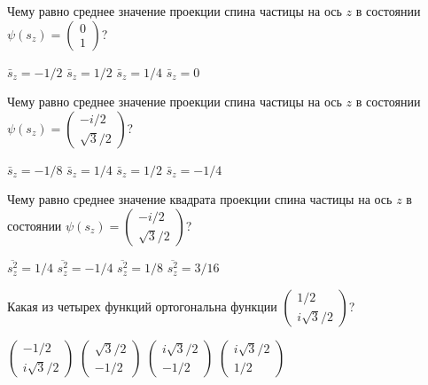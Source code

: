\documentclass[11pt,a4paper]{exam}
\begin{document}
\begin{questions}
\question Чему равно среднее значение проекции спина частицы на ось $z$ в состоянии $\psi ({s_z}) = \left( {\begin{array}{*{20}{c}}
0\\
1
\end{array}} \right)$?
\begin{choices}
\choice ${\bar s_z} =  - 1/2$      
\choice ${\bar s_z} = 1/2$      
\choice ${\bar s_z} = 1/4$      
\choice ${\bar s_z} = 0$
\end{choices}

\question Чему равно среднее значение проекции спина частицы на ось $z$ в состоянии $\psi ({s_z}) = \left( {\begin{array}{*{20}{c}}
{ - i/2}\\
{\sqrt 3 /2}
\end{array}} \right)$?
\begin{choices}
\choice ${\bar s_z} =  - 1/8$      
\choice ${\bar s_z} = 1/4$      
\choice ${\bar s_z} = 1/2$      
\choice ${\bar s_z} =  - 1/4$
\end{choices}

\question Чему равно среднее значение квадрата проекции спина частицы на ось $z$ в состоянии $\psi ({s_z}) = \left( {\begin{array}{*{20}{c}}
{ - i/2}\\
{\sqrt 3 /2}
\end{array}} \right)$?
\begin{choices}
\choice $\overline {s_z^2}  = 1/4$    
\choice $\overline {s_z^2}  =  - 1/4$    
\choice $\overline {s_z^2}  = 1/8$    
\choice $\overline {s_z^2}  = 3/16$
\end{choices}

\question Какая из четырех функций ортогональна функции $\left( {\begin{array}{*{20}{c}}
{1/2}\\
{i\sqrt 3 /2}
\end{array}} \right)$?
\begin{choices}
\choice $\left( {\begin{array}{*{20}{c}}
{ - 1/2}\\
{i\sqrt 3 /2}
\end{array}} \right)$      
\choice $\left( {\begin{array}{*{20}{c}}
{\sqrt 3 /2}\\
{ - 1/2}
\end{array}} \right)$      
\choice $\left( {\begin{array}{*{20}{c}}
{i\sqrt 3 /2}\\
{ - 1/2}
\end{array}} \right)$      
\choice $\left( {\begin{array}{*{20}{c}}
{i\sqrt 3 /2}\\
{1/2}
\end{array}} \right)$
\end{choices}


\end{questions}
\end{document}
